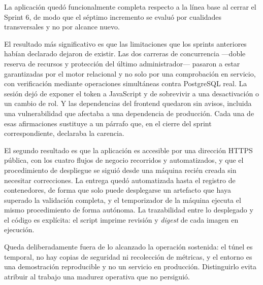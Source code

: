 La aplicación quedó funcionalmente completa respecto a la línea base al cerrar el Sprint 6, de modo que el séptimo incremento se evaluó por cualidades transversales y no por alcance nuevo.

El resultado más significativo es que las limitaciones que los sprints anteriores habían declarado dejaron de existir. Las dos carreras de concurrencia ---doble reserva de recursos y protección del último administrador--- pasaron a estar garantizadas por el motor relacional y no solo por una comprobación en servicio, con verificación mediante operaciones simultáneas contra PostgreSQL real. La sesión dejó de exponer el token a JavaScript y de sobrevivir a una desactivación o un cambio de rol. Y las dependencias del frontend quedaron sin avisos, incluida una vulnerabilidad que afectaba a una dependencia de producción. Cada una de esas afirmaciones sustituye a un párrafo que, en el cierre del sprint correspondiente, declaraba la carencia.

El segundo resultado es que la aplicación es accesible por una dirección HTTPS pública, con los cuatro flujos de negocio recorridos y automatizados, y que el procedimiento de despliegue se siguió desde una máquina recién creada sin necesitar correcciones. La entrega quedó automatizada hasta el registro de contenedores, de forma que solo puede desplegarse un artefacto que haya superado la validación completa, y el temporizador de la máquina ejecuta el mismo procedimiento de forma autónoma. La trazabilidad entre lo desplegado y el código es explícita: el script imprime revisión y \emph{digest} de cada imagen en ejecución.

Queda deliberadamente fuera de lo alcanzado la operación sostenida: el túnel es temporal, no hay copias de seguridad ni recolección de métricas, y el entorno es una demostración reproducible y no un servicio en producción. Distinguirlo evita atribuir al trabajo una madurez operativa que no persiguió.

